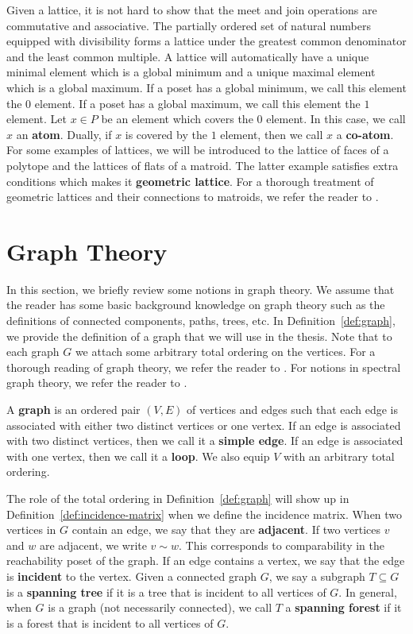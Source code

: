 \documentclass{puthesis-UG}
\begin{document}
Given a lattice, it is not hard to show that the meet and join operations are commutative and associative. The partially ordered set of natural numbers equipped with divisibility forms a lattice under the greatest common denominator and the least common multiple. A lattice will automatically have a unique minimal element which is a global minimum and a unique maximal element which is a global maximum. If a poset has a global minimum, we call this element the $0$ element. If a poset has a global maximum, we call this element the $1$ element. Let $x \in P$ be an element which covers the $0$ element. In this case, we call $x$ an \textbf{atom}. Dually, if $x$ is covered by the $1$ element, then we call $x$ a \textbf{co-atom}. For some examples of lattices, we will be introduced to the lattice of faces of a polytope and the lattices of flats of a matroid. The latter example satisfies extra conditions which makes it \textbf{geometric lattice}. For a thorough treatment of geometric lattices and their connections to matroids, we refer the reader to \cite{10.5555/1197093}. 

\section{Graph Theory} \label{sec:graph-theory}

In this section, we briefly review some notions in graph theory. We assume that the reader has some basic background knowledge on graph theory such as the definitions of connected components, paths, trees, etc. In Definition~\ref{def:graph}, we provide the definition of a graph that we will use in the thesis. Note that to each graph $G$ we attach some arbitrary total ordering on the vertices. For a thorough reading of graph theory, we refer the reader to \cite{diestel}. For notions in spectral graph theory, we refer the reader to \cite{chung-spectral-graph-theory}. 

\begin{defn} \label{def:graph}
	A \textbf{graph} is an ordered pair $(V, E)$ of vertices and edges such that each edge is associated with either two distinct vertices or one vertex. If an edge is associated with two distinct vertices, then we call it a \textbf{simple edge}. If an edge is associated with one vertex, then we call it a \textbf{loop}. We also equip $V$ with an arbitrary total ordering. 
\end{defn}

The role of the total ordering in Definition~\ref{def:graph} will show up in Definition~\ref{def:incidence-matrix} when we define the incidence matrix. When two vertices in $G$ contain an edge, we say that they are \textbf{adjacent}. If two vertices $v$ and $w$ are adjacent, we write $v \sim w$. This corresponds to comparability in the reachability poset of the graph. If an edge contains a vertex, we say that the edge is \textbf{incident} to the vertex. Given a connected graph $G$, we say a subgraph $T \subseteq G$ is a \textbf{spanning tree} if it is a tree that is incident to all vertices of $G$. In general, when $G$ is a graph (not necessarily connected), we call $T$ a \textbf{spanning forest} if it is a forest that is incident to all vertices of $G$. 
\end{document}
